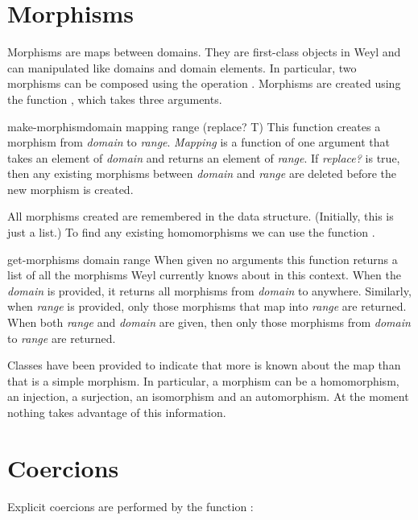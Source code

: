 \section{Morphisms}
\label{Morphisms:Sec}

Morphisms are maps between domains.  They are first-class objects in
Weyl and can manipulated like domains and domain elements.  In
particular, two morphisms can be composed using the operation
.  Morphisms are created using the function
, which takes three arguments. 

\begin{genericdef}{make-morphism}{domain mapping range \key (replace?
{\sf T})}
This function creates a morphism from {\em domain} to {\em range}.
{\em Mapping} is a function of one argument that takes an element of
{\em domain} and returns an element of {\em range\/}.  If {\em
replace?} is true, then any existing morphisms between {\em domain} and
{\em range} are deleted before the new morphism is created.
\end{genericdef}

All morphisms created are remembered in the 
data structure.  (Initially, this is just a list.)  To find any
existing homomorphisms we can use the function . 

\begin{functiondef}{get-morphisms}{\key{} domain range}
When given no arguments this function returns a list of all the
morphisms Weyl currently knows about in this context.  When the {\em
domain} is provided, it returns all morphisms from {\em domain} to
anywhere.  Similarly, when {\em range} is provided, only those
morphisms that map into {\em range} are returned.  When both {\em
range} and {\em domain} are given, then only those morphisms from {\em
domain} to {\em range} are returned.
\end{functiondef}

Classes have been provided to indicate that more is known about the
map than that is a simple morphism.  In particular, a morphism can be
a homomorphism, an injection, a surjection, an isomorphism and an
automorphism.  At the moment nothing takes advantage of this information.

\section{Coercions}
\label{Coercions:Sec}

Explicit coercions are performed by the function :

